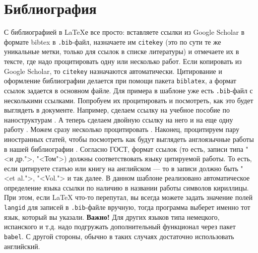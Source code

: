 \section{Библиография}

С библиографией в \LaTeX{}е все просто: вставляете ссылки из Google Scholar в формате bibtex в \verb|.bib|-файл, назначаете им \verb|citekey| (это по сути те же уникальные метки, только для ссылок в списке литературы) и отмечаете их в тексте, где надо процитировать одну или несколько работ. Если копировать из Google Scholar, то \verb|citekey| назначаются автоматически. Цитирование и оформление библиографии делается при помощи пакета \verb|biblatex|, а формат ссылок задается в основном файле. Для примера в шаблоне уже есть \verb|.bib|-файл с несколькими ссылками. Попробуем их процитировать и посмотреть, как это будет выглядеть в документе. Например, сделаем ссылку на учебное пособие по наноструктурам \cite{федоров2014физика}. А теперь сделаем двойную ссылку на него и на еще одну работу \cite{федоров2014физика,гапоненко2005оптика}. Можем сразу несколько процитировать \cite{gaponenko1998optical,федоров2014специальные,гапоненко2005оптика,калитеевская2018выделение}. Наконец, процитируем пару иностранных статей, чтобы посмотреть как будут выглядеть англоязычные работы \cite{dhamo2021efficient} в нашей библиографии \cite{miropoltsev2022influence,dey2021state}. Согласно ГОСТ, формат ссылок (то есть, записи типа "<и др.">, "<Том">) должны соответствовать языку цитируемой работы. То есть, если цитируете статью или книгу на английском --- то в записи должно быть "<et al.">, "<Vol."> и так далее. В данном шаблоне реализовано автоматическое определение языка ссылки по наличию в названии работы символов кириллицы. При этом, если \LaTeX{} что-то перепутал, вы всегда можете задать значение полей \verb|langid| для записей в \verb|.bib|-файле вручную, тогда программа выберет именно тот язык, который вы указали. \textbf{Важно!} Для других языков типа немецкого, испанского и т.д. надо подгружать дополнительный функционал через пакет \verb|babel|. С другой стороны, обычно в таких случаях достаточно использовать английский.

\endinput